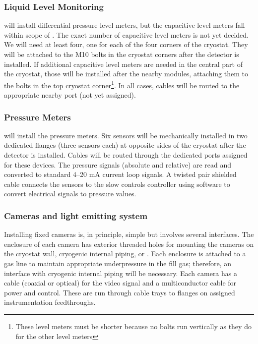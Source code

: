 \subsubsection{Liquid Level Monitoring}
\label{sec:fdgen-slow-cryo-install-llm}


 will install differential pressure level meters, but the capacitive level meters fall within scope of . The exact number of capacitive level meters is not yet decided. We will need at least four, one for each of the four corners of the cryostat.  
They will be attached to the M10 bolts in the cryostat corners after the detector is installed. If additional capacitive level meters are needed in the central part of the cryostat, those will be installed after the nearby  modules, attaching them to the bolts in the top cryostat corner\footnote{These level meters must be shorter because no bolts run vertically as they do for the other level meters}. In all cases, cables will be routed to the appropriate nearby port (not yet assigned). 

\subsubsection{Pressure Meters}
\label{sec:fdgen-slow-cryo-install-press}
 will install the pressure meters. Six sensors will be mechanically installed in two dedicated flanges (three sensors each) at opposite sides of the cryostat after the detector is installed. Cables will be routed through the dedicated ports assigned for these devices. The pressure signals (absolute and relative) are read and converted to
standard 4--20 mA current loop signals.
A twisted pair shielded cable connects the sensors to the slow controls  controller using software to convert electrical signals to pressure values.

\subsubsection{Cameras and light emitting system}
\label{sec:fdgen-slow-cryo-install-c}

Installing fixed cameras is, in principle, simple but involves several interfaces. The enclosure of each camera has
exterior threaded holes for mounting the cameras on the cryostat wall,
cryogenic internal piping, or . Each
enclosure %
is attached to a gas line to maintain appropriate
underpressure in the fill gas; %
therefore, an interface with cryogenic
internal piping will be necessary. Each camera has a cable (coaxial or
optical) for the video signal and a multiconductor cable for power and
control. These %
are run through cable trays to flanges on assigned
instrumentation feedthroughs.

